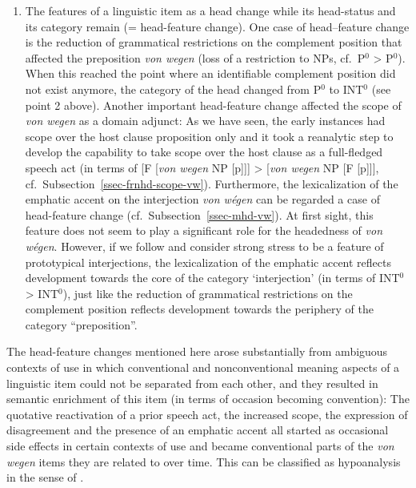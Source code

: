 \documentclass[output=paper
  ,nobabel
  ,draftmode
  ,babelshorthands
  ,colorlinks, citecolor=brown
]{langscibook}
\begin{document}
\begin{enumerate}
    \item The features of a linguistic item as a head change while its head-status and its category remain (= head-feature change). One case of head--feature change is the reduction of grammatical restrictions on the complement position that affected the preposition \emph{von wegen} (loss of a restriction to NPs, cf.\ P$^0$ > P$^0$). When this reached the point where an identifiable complement position did not exist anymore, the category of the head changed from P$^0$ to INT$^0$ (see point 2 above). Another important head-feature change affected the scope of \emph{von wegen} as a domain adjunct: As we have seen, the early instances had scope over the host clause proposition only and it took a reanalytic step to develop the capability to take scope over the host clause as a full-fledged speech act (in terms of [F [\emph{von wegen} NP [p]]] > [\emph{von wegen} NP [F [p]]], cf.\ Subsection~\ref{ssec-frnhd-scope-vw}). Furthermore, the lexicalization of the emphatic accent on the interjection \emph{von wégen} can be regarded a case of head-feature change (cf.\ Subsection~\ref{ssec-mhd-vw}). At first sight, this feature does not seem to play a significant role for the headedness of \emph{von wégen}. However, if we follow \citet[18]{Nuebling2004} and consider strong stress to be a feature of prototypical interjections, the lexicalization of the emphatic accent reflects development towards the core of the category `interjection' (in terms of INT$^0$ > INT$^0$), just like the reduction of grammatical restrictions on the complement position reflects development towards the periphery of the category “preposition”.
\end{enumerate}

\noindent
The head-feature changes mentioned here arose substantially from ambiguous contexts of use in which
conventional and nonconventional meaning aspects of a linguistic item could not be separated from
each other, and they resulted in semantic enrichment of this item (in terms of occasion becoming
convention): The quotative reactivation of a prior speech act, the increased scope, the expression
of disagreement and the presence of an emphatic accent all started as occasional side effects in
certain contexts of use and became conventional parts of the \emph{von wegen} items they are related
to over time. This can be classified as hypoanalysis in the sense of
\citet[126–130]{Croft2000}.%
\end{document}
